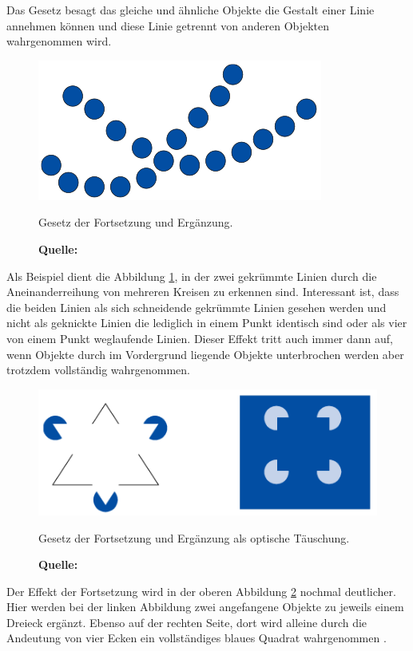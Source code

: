 Das Gesetz besagt das gleiche und ähnliche Objekte die Gestalt einer Linie annehmen können und diese Linie getrennt von anderen Objekten wahrgenommen wird.
\begin{figure}[H]
  \centering
  \includegraphics[scale=1]{img/gesetz_der_Fortsetzung_und_Ergaenzung.PNG}
  \caption{Gesetz der Fortsetzung und Ergänzung.}
    \caption*{\textbf{Quelle:} \citep{Dahm2006}}
  \label{fig:fortsetzungUndErgaenzung1}
\end{figure}
Als Beispiel dient die Abbildung \ref{fig:fortsetzungUndErgaenzung1}, in der zwei gekrümmte Linien durch die Aneinanderreihung von mehreren Kreisen zu erkennen sind. Interessant ist, dass die beiden Linien als sich schneidende gekrümmte Linien gesehen werden und nicht als geknickte Linien die lediglich in einem Punkt identisch sind oder als vier von einem Punkt weglaufende Linien. Dieser Effekt tritt auch immer dann auf, wenn Objekte durch im Vordergrund liegende Objekte unterbrochen werden aber trotzdem vollständig wahrgenommen.
\begin{figure}[H]
  \centering
  \includegraphics[scale=1]{img/gesetz_der_Fortsetzung_und_Ergaenzung2.PNG}
  \caption{Gesetz der Fortsetzung und Ergänzung als optische Täuschung.}
    \caption*{\textbf{Quelle:} \citep{Dahm2006}}
  \label{fig:fortsetzungUndErgaenzung2}
\end{figure}
Der Effekt der Fortsetzung wird in der oberen Abbildung \ref{fig:fortsetzungUndErgaenzung2} nochmal deutlicher. Hier werden bei der linken Abbildung zwei angefangene Objekte zu jeweils einem Dreieck ergänzt. Ebenso auf der rechten Seite, dort wird alleine durch die Andeutung von vier Ecken ein vollständiges blaues Quadrat wahrgenommen \citep[vgl.][61f]{Dahm2006}.

